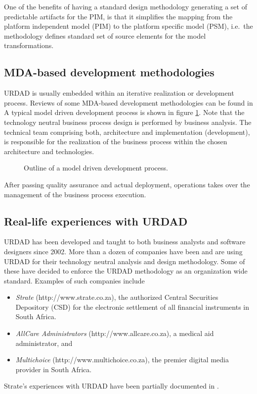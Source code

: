 \documentclass{IOS-Book-Article}
\begin{document}
One of the benefits of having a standard design methodology generating a set of
predictable artifacts for the PIM, is that it simplifies the mapping from the platform
independent model (PIM) to the platform specific model (PSM), i.e.\ the methodology defines
standard set of source elements for the model transformations.


\subsection{MDA-based development methodologies}

URDAD is usually embedded within an iterative realization or development process. Reviews of some
MDA-based development methodologies can be found in \cite{bercovici:businessArchitectureToSoa}
A typical model driven development process is shown in figure \ref{fig:developmentProcess}. 
Note that the technology neutral business process design is performed by business analysis. 
The technical team comprising both, architecture and implementation (development), 
is responsible for the realization of the business process within the chosen architecture and technologies.

\begin{figure}
  \centering
  \caption{Outline of a model driven development process.}
  \label{fig:developmentProcess}
\end{figure}

After passing quality assurance and actual deployment, operations takes over the management of the
business process execution.


\subsection{Real-life experiences with URDAD}

URDAD has been developed and taught to both business analysts and software designers since 2002.
More than a dozen of companies have been and are using URDAD for their technology neutral analysis
and design methodology. Some of these have decided to enforce the URDAD methodology as an organization
wide standard. Examples of such companies include
\begin{itemize}
  \item {\em Strate} (http://www.strate.co.za), the authorized Central Securities Depository (CSD) for the electronic settlement of all financial instruments in South Africa.
	\item {\em AllCare Administrators} (http://www.allcare.co.za), a medical aid administrator, and
	\item {\em Multichoice} (http://www.multichoice.co.za), the premier digital media provider in South Africa.
\end{itemize}
Strate's experiences with URDAD have been partially documented in \cite{klopper:compareSoftwareMethodologies}.
\end{document}
